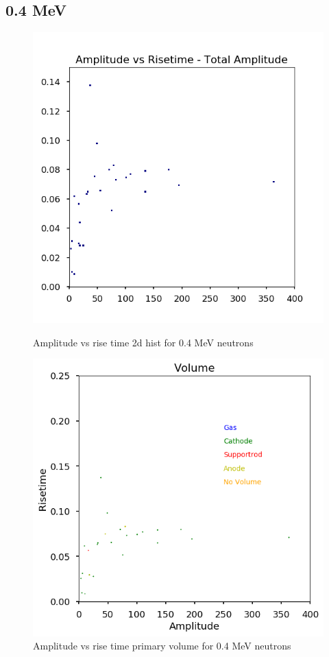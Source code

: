 \documentclass[a4paper]{article}
\begin{document}
\subsection{0.4 MeV}
\begin{figure}[H]
    \centering
    \begin{minipage}{.5\textwidth}
        \centering
        \includegraphics[width=1\linewidth]{Fast/steel_achinos-2d_fast.png}
        \caption{Amplitude vs rise time 2d hist for 0.4 MeV neutrons}
        \label{fig:prob1_6_2}
    \end{minipage}%
    \begin{minipage}{0.5\textwidth}
        \centering
        \includegraphics[width=1\linewidth]{Fast/steel_achinos_vol_38_fast.png}
        \caption{Amplitude vs rise time primary volume for 0.4 MeV neutrons}
        \label{fig:prob1_6_1}
    \end{minipage}
\end{figure}
\end{document}
